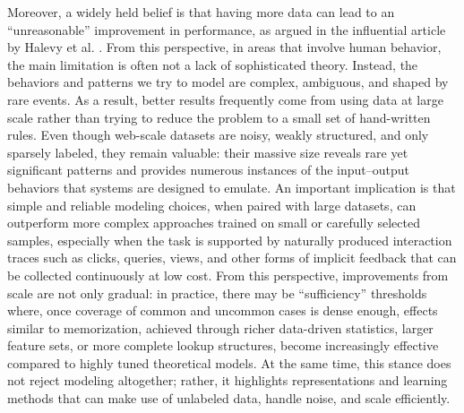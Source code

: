 \documentclass[12pt,a4paper]{article}
\begin{document}
Moreover, a widely held belief is that having more data can lead to an “unreasonable” improvement in performance, as argued in the influential article by Halevy et al. \cite{halevy2009}. From this perspective, in areas that involve human behavior, the main limitation is often not a lack of sophisticated theory. Instead, the behaviors and patterns we try to model are complex, ambiguous, and shaped by rare events. As a result, better results frequently come from using data at large scale rather than trying to reduce the problem to a small set of hand-written rules. Even though web-scale datasets are noisy, weakly structured, and only sparsely labeled, they remain valuable: their massive size reveals rare yet significant patterns and provides numerous instances of the input--output behaviors that systems are designed to emulate. An important implication is that simple and reliable modeling choices, when paired with large datasets, can outperform more complex approaches trained on small or carefully selected samples, especially when the task is supported by naturally produced interaction traces such as clicks, queries, views, and other forms of implicit feedback that can be collected continuously at low cost. From this perspective, improvements from scale are not only gradual: in practice, there may be “sufficiency” thresholds where, once coverage of common and uncommon cases is dense enough, effects similar to memorization, achieved through richer data-driven statistics, larger feature sets, or more complete lookup structures, become increasingly effective compared to highly tuned theoretical models. At the same time, this stance does not reject modeling altogether; rather, it highlights representations and learning methods that can make use of unlabeled data, handle noise, and scale efficiently.
\end{document}
